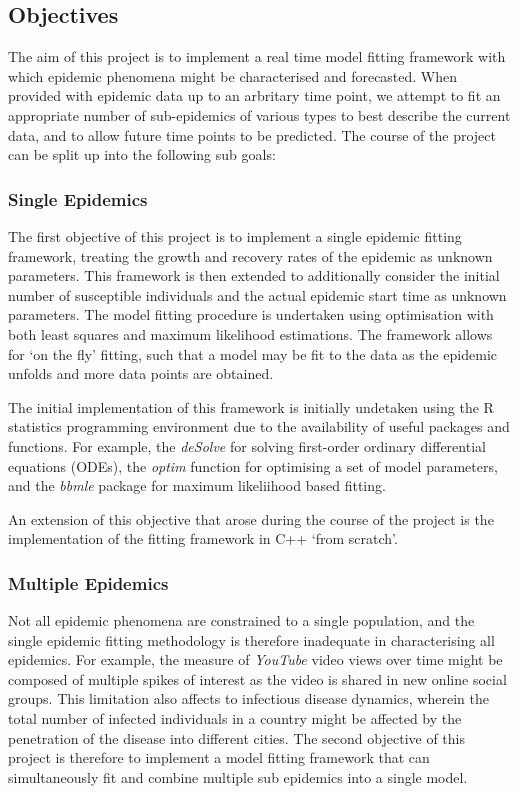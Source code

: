 \documentclass[11pt, a4paper, oneside,titlepage]{article}
\begin{document}
\subsection{Objectives}
The aim of this project is to implement a real time model fitting
framework with which epidemic phenomena might be characterised and
forecasted. When provided with epidemic data up to an arbritary time point,
we attempt to fit an appropriate number of sub-epidemics of various
types to best describe the current data, and to allow future time
points to be predicted. The course of the project can be split up into
the following sub goals:

\subsubsection{Single Epidemics}
The first objective of this project is to implement a single epidemic
fitting framework, treating the growth and recovery rates of the
epidemic as unknown parameters. This framework is then extended to
additionally consider the initial number of susceptible individuals
and the actual epidemic start time as unknown parameters. The model
fitting procedure is undertaken using optimisation with both least
squares and maximum likelihood estimations. The framework allows for
`on the fly' fitting, such that a model may be fit to the data as the
epidemic unfolds and more data points are obtained.

The initial implementation of this framework is initially undetaken using the R
statistics programming environment due to the availability of useful
packages and functions. For example, the \emph{deSolve} for solving
first-order ordinary differential equations (ODEs), the \emph{optim}
function for optimising a set of model parameters, and the
\emph{bbmle} package for maximum likeliihood based fitting.

An extension of this objective that arose during the course of the
project is the implementation of the fitting framework in C++ `from
scratch'.

\subsubsection{Multiple Epidemics}
Not all epidemic phenomena are constrained to a single population, and
the single epidemic fitting methodology is therefore inadequate in
characterising all epidemics. For example, the measure of
\emph{YouTube} video views over time might be composed of multiple
spikes of interest as the video is shared in new online social
groups. This limitation also affects to infectious disease dynamics,
wherein the total number of infected individuals in a country might be
affected by the penetration of the disease into different cities. The
second objective of this project is therefore to implement a model
fitting framework that can simultaneously fit and combine multiple
sub epidemics into a single model. 
\end{document}
